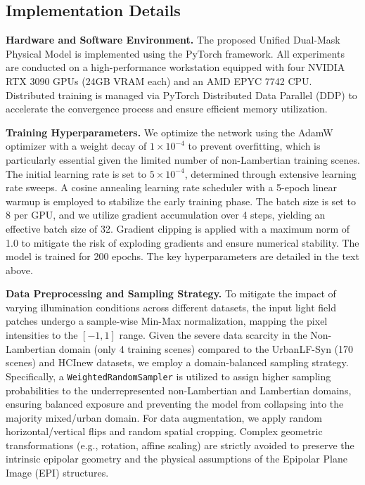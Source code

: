\documentclass[lettersize,journal]{IEEEtran}
\begin{document}
\subsection{Implementation Details}

\textbf{Hardware and Software Environment.} 
The proposed Unified Dual-Mask Physical Model is implemented using the PyTorch framework. All experiments are conducted on a high-performance workstation equipped with four NVIDIA RTX 3090 GPUs (24GB VRAM each) and an AMD EPYC 7742 CPU. Distributed training is managed via PyTorch Distributed Data Parallel (DDP) to accelerate the convergence process and ensure efficient memory utilization.

\textbf{Training Hyperparameters.} 
We optimize the network using the AdamW optimizer with a weight decay of $1 \times 10^{-4}$ to prevent overfitting, which is particularly essential given the limited number of non-Lambertian training scenes. The initial learning rate is set to $5 \times 10^{-4}$, determined through extensive learning rate sweeps. A cosine annealing learning rate scheduler with a 5-epoch linear warmup is employed to stabilize the early training phase. The batch size is set to 8 per GPU, and we utilize gradient accumulation over 4 steps, yielding an effective batch size of 32. Gradient clipping is applied with a maximum norm of 1.0 to mitigate the risk of exploding gradients and ensure numerical stability. The model is trained for 200 epochs. The key hyperparameters are detailed in the text above.

\textbf{Data Preprocessing and Sampling Strategy.} 
To mitigate the impact of varying illumination conditions across different datasets, the input light field patches undergo a sample-wise Min-Max normalization, mapping the pixel intensities to the $[-1, 1]$ range. Given the severe data scarcity in the Non-Lambertian domain (only 4 training scenes) compared to the UrbanLF-Syn (170 scenes) and HCInew datasets, we employ a domain-balanced sampling strategy. Specifically, a \texttt{WeightedRandomSampler} is utilized to assign higher sampling probabilities to the underrepresented non-Lambertian and Lambertian domains, ensuring balanced exposure and preventing the model from collapsing into the majority mixed/urban domain. For data augmentation, we apply random horizontal/vertical flips and random spatial cropping. Complex geometric transformations (e.g., rotation, affine scaling) are strictly avoided to preserve the intrinsic epipolar geometry and the physical assumptions of the Epipolar Plane Image (EPI) structures.
\end{document}
